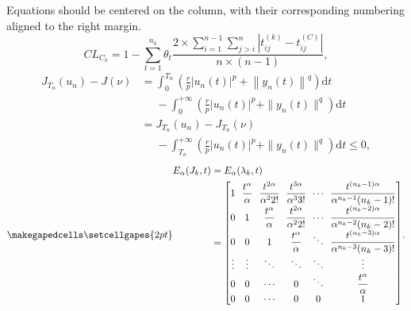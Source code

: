\documentclass{jcd}
\theoremstyle{plain}
\theoremstyle{definition}
\begin{document}
Equations should be centered on the column, with their corresponding numbering aligned to the right margin.
\begin{equation}
CL_{C_{k}} =1-\sum_{t=1}^{n_{k}}\theta_t
\dfrac{\displaystyle 2\times\sum_{i=1}^{n-1}\sum_{j>i}^n\left|t_{ij}^{(k)}-t_{ij}^{(C)}\right|}{\displaystyle n\times(n-1)},
\end{equation}
\begin{equation}
  \begin{aligned}
J_{T_n}(u_n)-J(\nu) &=\int_0^{T_n}\left(\frac{r}{p}{\left|u_n(t)\right|}^p+{\left\|y_n(t)\right\|}^q\right)\mathrm{d}t \\
 &\phantom{=} -\int_0^{+\infty}\left(\frac{r}{p}|u_n(t)|^p+\|y_n(t)\|^q\right)\mathrm{d}t \\
 &= J_{T_n}(u_n)-J_{T_n}(\nu) \\
 &\phantom{=} -\int_{T_n}^{+\infty}\left(\frac{r}{p}|u_n(t)|^p+\|y_n(t)\|^q\right)\mathrm{d}t\leq0,
  \end{aligned}
\end{equation}
\begin{equation}\makegapedcells\setcellgapes{2pt}\setlength{\arraycolsep}{3.2pt}
  \begin{aligned}
  E_{\alpha}(J_{k},t) & =E_\alpha(\lambda_k,t) \\
  & =
  \begin{bmatrix}
  1 & \dfrac{t^\alpha}{\alpha} & \dfrac{t^{2\alpha}}{\alpha^22!} & \dfrac{t^{3\alpha}}{\alpha^33!} & \cdots & \dfrac{t^{(n_k-1)\alpha}}{\alpha^{n_k-1}(n_k-1)!} \\
  0 & 1 & \dfrac{t^\alpha}{\alpha} & \dfrac{t^{2\alpha}}{\alpha^22!} & \cdots & \dfrac{t^{(n_k-2)\alpha}}{\alpha^{n_k-2}(n_k-2)!} \\
  0 & 0 & 1 & \dfrac{t^\alpha}{\alpha} & \ddots & \dfrac{t^{(n_k-3)\alpha}}{\alpha^{n_k-3}(n_k-3)!} \\
  \vdots & \vdots & \ddots & \ddots & \ddots & \vdots \\
  0 & 0 & \cdots & 0 & \ddots & \dfrac{t^\alpha}{\alpha} \\
  0 & 0 & \cdots & 0 & 0 & 1
  \end{bmatrix}
  \end{aligned}.
\end{equation}
\end{document}
